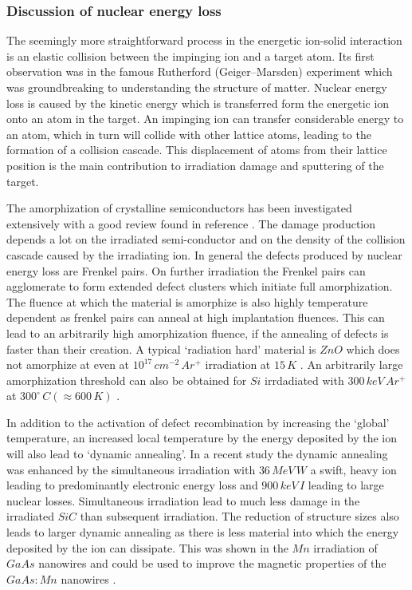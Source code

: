 \subsubsection{Discussion of nuclear energy loss}

The seemingly more straightforward process in the energetic ion-solid interaction is an elastic collision between the impinging ion and a target atom. Its first observation was in the famous Rutherford (Geiger–Marsden) experiment \cite{rutherford_scattering_1911} which was groundbreaking to understanding the structure of matter. Nuclear energy loss is caused by the kinetic energy which is transferred form the energetic ion onto an atom in the target. An impinging ion can transfer considerable energy to an atom, which in turn will collide with other lattice atoms, leading to the formation of a collision cascade. This displacement of atoms from their lattice position is the main contribution to irradiation damage and sputtering of the target. 

The amorphization of crystalline semiconductors has been investigated extensively with a good review found in reference \cite{wesch_damage_2012}. The damage production depends a lot on the irradiated semi-conductor and on the density of the collision cascade caused by the irradiating ion. In general the defects produced by nuclear energy loss are Frenkel pairs. On further irradiation the Frenkel pairs can agglomerate to form extended defect clusters which initiate full amorphization. The fluence at which the material is amorphize is also highly temperature dependent as frenkel pairs can anneal at high implantation fluences. This can lead to an arbitrarily high amorphization fluence, if the annealing of defects is faster than their creation. A typical `radiation hard' material is $ZnO$ which does not amorphize at even at $10^{17}\,cm^{-2}\,Ar^+$ irradiation at $15\,K$ \cite{wesch_damage_2012}. An arbitrarily large amorphization threshold can also be obtained for $Si$ irrdadiated with $300\,keV\,Ar^+$ at $300^\circ\,C (\approx 600\,K)$ \cite{pelaz_ion-beam-induced_2004}.

In addition to the activation of defect recombination by increasing the `global' temperature, an increased local temperature by the energy deposited by the ion will also lead to `dynamic annealing'. In a recent study \cite{thome_recovery_2015} the dynamic annealing was enhanced by the simultaneous irradiation with $36\,MeV\,W$ a swift, heavy ion leading to predominantly electronic energy loss and $900\,keV\,I$ leading to large nuclear losses. Simultaneous irradiation lead to much less damage in the irradiated $SiC$ than subsequent irradiation. The reduction of structure sizes also leads to larger dynamic annealing as there is less material into which the energy deposited by the ion can dissipate. This was shown in the $Mn$ irradiation of $GaAs$ nanowires \cite{borschel_ion-solid_2012,johannes_ion_2015} and could be used to improve the magnetic properties of the $GaAs:Mn$ nanowires \cite{borschel_new_2011,paschoal_hopping_2012,kumar_magnetic_2013,paschoal_magnetoresistance_2014}. 

